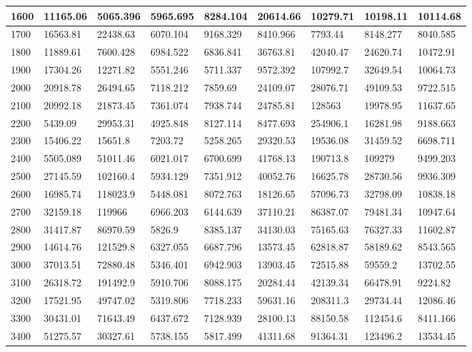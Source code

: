 \documentclass [11pt, proquest] {uwthesis}[2020/12/20]
\begin{document}
\begin{table}
\begin{tiny}
\begin{tabular}{|l|l|l|l|l|l|l|l|l|}
1600 & 11165.06 & 5065.396 & 5965.695 & 8284.104 & 20614.66 & 10279.71 & 10198.11 & 10114.68 \\ \hline
1700 & 16563.81 & 22438.63 & 6070.104 & 9168.329 & 8410.966 & 7793.44 & 8148.277 & 8040.585 \\ \hline
1800 & 11889.61 & 7600.428 & 6984.522 & 6836.841 & 36763.81 & 42040.47 & 24620.74 & 10472.91 \\ \hline
1900 & 17304.26 & 12271.82 & 5551.246 & 5711.337 & 9572.392 & 107992.7 & 32649.54 & 10064.73 \\ \hline
2000 & 20918.78 & 26494.65 & 7118.212 & 7859.69 & 24109.07 & 28076.71 & 49109.53 & 9722.515 \\ \hline
2100 & 20992.18 & 21873.45 & 7361.074 & 7938.744 & 24785.81 & 128563 & 19978.95 & 11637.65 \\ \hline
2200 & 5439.09 & 29953.31 & 4925.848 & 8127.114 & 8477.693 & 254906.1 & 16281.98 & 9188.663 \\ \hline
2300 & 15406.22 & 15651.8 & 7203.72 & 5258.265 & 29320.53 & 19536.08 & 31459.52 & 6698.711 \\ \hline
2400 & 5505.089 & 51011.46 & 6021.017 & 6700.699 & 41768.13 & 190713.8 & 109279 & 9499.203 \\ \hline
2500 & 27145.59 & 102160.4 & 5934.129 & 7351.912 & 40052.76 & 16625.78 & 28730.56 & 9936.309 \\ \hline
2600 & 16985.74 & 118023.9 & 5448.081 & 8072.763 & 18126.65 & 57096.73 & 32798.09 & 10838.18 \\ \hline
2700 & 32159.18 & 119966 & 6966.203 & 6144.639 & 37110.21 & 86387.07 & 79481.34 & 10947.64 \\ \hline
2800 & 31417.87 & 86970.59 & 5826.9 & 8385.137 & 34130.03 & 75165.63 & 76327.33 & 11602.87 \\ \hline
2900 & 14614.76 & 121529.8 & 6327.055 & 6687.796 & 13573.45 & 62818.87 & 58189.62 & 8543.565 \\ \hline
3000 & 37013.51 & 72880.48 & 5346.401 & 6942.903 & 13903.45 & 72515.88 & 59559.2 & 13702.55 \\ \hline
3100 & 26318.72 & 191492.9 & 5910.706 & 8088.175 & 20284.44 & 42139.34 & 66478.91 & 9224.82 \\ \hline
3200 & 17521.95 & 49747.02 & 5319.806 & 7718.233 & 59631.16 & 208311.3 & 29734.44 & 12086.46 \\ \hline
3300 & 30431.01 & 71643.49 & 6437.672 & 7128.939 & 28100.13 & 88150.58 & 112454.6 & 8411.166 \\ \hline
3400 & 51275.57 & 30327.61 & 5738.155 & 5817.499 & 41311.68 & 91364.31 & 123496.2 & 13534.45 \\ \hline

\end{tabular}
\end{tiny}
\end{table}
\end{document}
